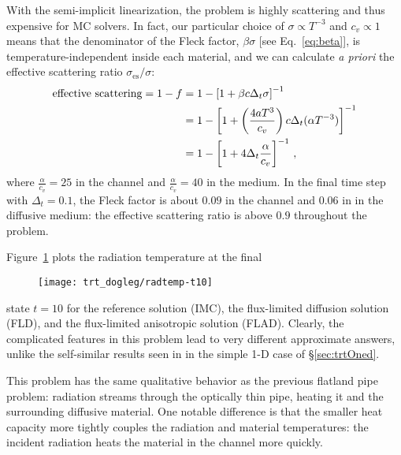 With the semi-implicit linearization, the problem is highly scattering and
thus expensive for MC solvers. In fact, our particular choice of $\sigma
\propto T^{-3}$ and $c_v \propto 1$ means that the denominator of the Fleck
factor, $\beta \sigma$ [see Eq.~\eqref{eq:beta}], is
temperature-independent inside each material, and we can calculate \emph{a
priori} the effective scattering ratio $\sigma_\text{es}/\sigma$:
\begin{align*}
  \text{effective scattering} = 1 - f
  &= 1 - \left[ 1 + \beta c \Delta_t \sigma \right]^{-1}
  \\
  &= 1 -  \left[ 1 +\left(  \frac{4 a T^3}{ c_v } \right) c \Delta_t (\alpha T^{-3}) \right]^{-1}
  \\
  &= 1 - \left[ 1 + 4 \Delta_t \frac{\alpha}{c_v} \right]^{-1}\,,
\end{align*}
where $\frac{\alpha}{c_v} = 25$ in the channel and $\frac{\alpha}{c_v} = 40$ in
the medium. In the final time step with $\Delta_t=0.1$, the Fleck factor is
about $0.09$ in the channel and $0.06$ in in the
diffusive medium: the effective scattering ratio is above $0.9$ throughout the
problem.

Figure~\ref{fig:doglegRadtempFinal} plots the radiation temperature at the final
%
\begin{figure}[htb]
  \centering
  \texttt{[image: trt\_dogleg/radtemp-t10]}
  \label{fig:doglegRadtempFinal}
\end{figure}
%
state $t=10$ for the reference solution (IMC), the flux-limited diffusion
solution (FLD), and the flux-limited anisotropic solution (FLAD). Clearly, the
complicated features in this problem lead to very different approximate
answers, unlike the self-similar results seen in in the simple 1-D case of
\S\ref{sec:trtOned}.

This problem has the same qualitative behavior as the previous flatland pipe
problem: radiation streams through the optically thin pipe, heating it and
the surrounding diffusive material. One notable difference is that the smaller
heat capacity more tightly
couples the radiation and material temperatures: the incident radiation heats
the material in the channel more quickly.

